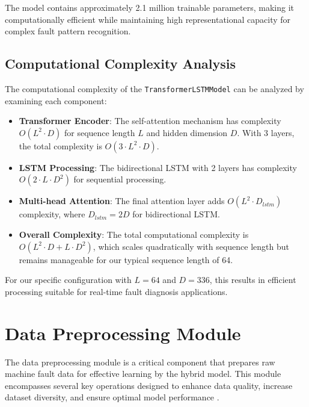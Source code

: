 The model contains approximately 2.1 million trainable parameters, making it computationally efficient while maintaining high representational capacity for complex fault pattern recognition.

\subsection{Computational Complexity Analysis}
\label{subsec:complexity_analysis}

The computational complexity of the \texttt{TransformerLSTMModel} can be analyzed by examining each component:

\begin{itemize}
    \item \textbf{Transformer Encoder}: The self-attention mechanism has complexity $O(L^2 \cdot D)$ for sequence length $L$ and hidden dimension $D$. With 3 layers, the total complexity is $O(3 \cdot L^2 \cdot D)$.
    
    \item \textbf{LSTM Processing}: The bidirectional LSTM with 2 layers has complexity $O(2 \cdot L \cdot D^2)$ for sequential processing.
    
    \item \textbf{Multi-head Attention}: The final attention layer adds $O(L^2 \cdot D_{lstm})$ complexity, where $D_{lstm} = 2D$ for bidirectional LSTM.
    
    \item \textbf{Overall Complexity}: The total computational complexity is $O(L^2 \cdot D + L \cdot D^2)$, which scales quadratically with sequence length but remains manageable for our typical sequence length of 64.
\end{itemize}

For our specific configuration with $L = 64$ and $D = 336$, this results in efficient processing suitable for real-time fault diagnosis applications.

\section{Data Preprocessing Module}
\label{sec:hybrid_model:preprocessing}

The data preprocessing module is a critical component that prepares raw machine fault data for effective learning by the hybrid model. This module encompasses several key operations designed to enhance data quality, increase dataset diversity, and ensure optimal model performance \citep{zhang2019deep, liu2018artificial}.

